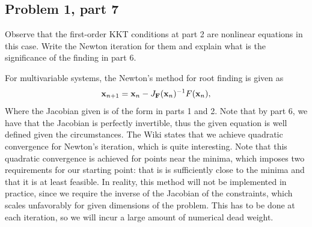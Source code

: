 \subsection{Problem 1, part 7}
Observe that the first-order KKT conditions at part 2 are nonlinear equations in this case. Write the Newton iteration for them and explain what is the significance of the finding in part 6. 
\partbreak
\begin{solution}

    For multivariable systems, the Newton's method for root finding is given as 
    \[\textbf{x}_{n+1} = \textbf{x}_n - J_\textbf{F}(\textbf{x}_n)^{-1} F(\textbf{x}_n),\]
    Where the Jacobian given is of the form in parts 1 and 2. Note that by part 6, we have that the Jacobian is perfectly invertible, thus the given equation is well defined given the circumstances. The Wiki states that we achieve quadratic convergence for Newton's iteration, which is quite interesting. Note that this quadratic convergence is achieved for points near the minima, which imposes two requirements for our starting point: that is is sufficiently close to the minima and that it is at least feasible. In reality, this method will not be implemented in practice, since we require the inverse of the Jacobian of the constraints, which scales unfavorably for given dimensions of the problem. This has to be done at each iteration, so we will incur a large amount of numerical dead weight.   
\end{solution}

\newpage

